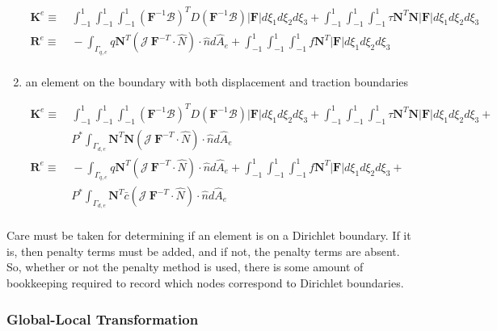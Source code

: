 \documentclass[10pt]{article}
\begin{document}
\begin{enumerate}
\begin{equation}
\begin{aligned}
\textbf{K}^e\equiv&\ \int_{-1}^{1}\int_{-1}^{1}\int_{-1}^{1}(\textbf{F}^{-1}\mathscr{B})^TD(\textbf{F}^{-1}\mathscr{B}) |\textbf{F}|d\xi_1d\xi_2d\xi_3+\int_{-1}^{1}\int_{-1}^{1}\int_{-1}^{1}\tau \textbf{N}^T\textbf{N} |\textbf{F}|d\xi_1d\xi_2d\xi_3\\
\textbf{R}^e\equiv&\ -\int_{\Gamma_{q,e}}q\textbf{N}^T(\mathscr{J}\ \textbf{F}^{-T}\cdot\hat{N})\cdot\hat{n}d\hat{A}_e+\int_{-1}^{1}\int_{-1}^{1}\int_{-1}^{1}f\textbf{N}^T|\textbf{F}|d\xi_1d\xi_2d\xi_3\\
\end{aligned}
\end{equation}

\item an element on the boundary with both displacement and traction boundaries

\begin{equation}
\begin{aligned}
\textbf{K}^e\equiv&\ \int_{-1}^{1}\int_{-1}^{1}\int_{-1}^{1}(\textbf{F}^{-1}\mathscr{B})^TD(\textbf{F}^{-1}\mathscr{B}) |\textbf{F}|d\xi_1d\xi_2d\xi_3+\int_{-1}^{1}\int_{-1}^{1}\int_{-1}^{1}\tau \textbf{N}^T\textbf{N} |\textbf{F}|d\xi_1d\xi_2d\xi_3+\quad\\
&\ P^{*}\int_{\Gamma_{d,e}}\textbf{N}^T\textbf{N} (\mathscr{J}\ \textbf{F}^{-T}\cdot\hat{N})\cdot\hat{n}d\hat{A}_e\\
\textbf{R}^e\equiv&\ -\int_{\Gamma_{q,e}}q\textbf{N}^T(\mathscr{J}\ \textbf{F}^{-T}\cdot\hat{N})\cdot\hat{n}d\hat{A}_e+\int_{-1}^{1}\int_{-1}^{1}\int_{-1}^{1}f\textbf{N}^T|\textbf{F}|d\xi_1d\xi_2d\xi_3+\quad\\
&\ P^{*}\int_{\Gamma_{d,e}}\textbf{N}^T\bar{c}(\mathscr{J}\ \textbf{F}^{-T}\cdot\hat{N})\cdot\hat{n}d\hat{A}_e\\
\end{aligned}
\end{equation}
\end{enumerate}

Care must be taken for determining if an element is on a Dirichlet boundary. If it is, then penalty terms must be added, and if not, the penalty terms are absent. So, whether or not the penalty method is used, there is some amount of bookkeeping required to record which nodes correspond to Dirichlet boundaries.

\subsubsection{Global-Local Transformation}
\end{document}

